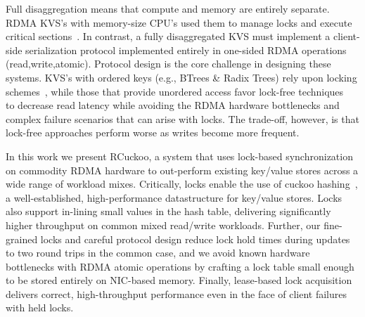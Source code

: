 Full disaggregation means that compute and memory are entirely separate. RDMA KVS's with memory-size
CPU's used them to manage locks and execute critical
sections~\cite{memc3,pilaf,cell,cuckoo-improvements}. In contrast, a fully disaggregated KVS must
implement a client-side serialization protocol implemented entirely in one-sided RDMA operations
(read,write,atomic). Protocol design is the core challenge in designing these systems. KVS's with
ordered keys 
(e.g., BTrees \& Radix Trees) rely upon locking schemes~\cite{smart,sherman}, while those that
provide unordered access favor lock-free techniques~\cite{rolex,ditto,fusee,clover} to decrease read
latency while avoiding the RDMA hardware bottlenecks and complex failure scenarios that can arise
with locks.  The trade-off, however, is that lock-free approaches perform worse as writes become
more frequent.

In this work we present RCuckoo, a system that uses lock-based synchronization
on commodity RDMA hardware to out-perform existing key/value stores across a
wide range of workload mixes.
Critically, locks enable the use of cuckoo hashing~\cite{cuckoo}, a
well-established, high-performance datastructure for key/value stores.
Locks also support in-lining small values in the hash table,
delivering
significantly higher throughput on common mixed read/write workloads.
Further, our fine-grained locks and careful protocol design reduce
lock hold times during updates to two round trips in the common
case, and we avoid known hardware bottlenecks with RDMA atomic
operations by crafting a lock table small enough to be stored entirely
on NIC-based memory.  Finally, lease-based lock acquisition
delivers correct, high-throughput performance even in the
face of client failures with held locks.

